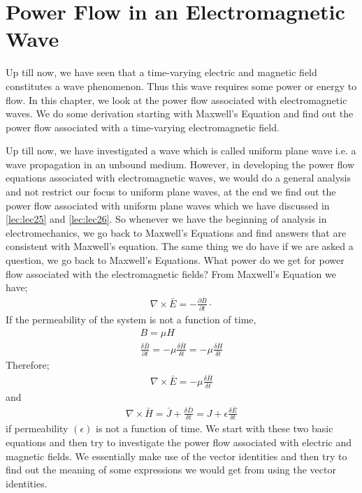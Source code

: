 \chapter{Power Flow in an Electromagnetic Wave}\label{lec:lec27}
Up till now, we have seen that a time-varying electric and magnetic field constitutes a wave phenomenon. Thus this wave requires some power or energy to flow. In this chapter, we look at the power flow associated with electromagnetic waves. We do some derivation starting with Maxwell's Equation and find out the power flow associated with a time-varying electromagnetic field.

Up till now, we have investigated a wave which is called uniform plane wave i.e. a wave propagation in an unbound medium. However, in developing the power flow equations associated with electromagnetic waves, we would do a general analysis and not restrict our focus to uniform plane waves, at the end we find out the power flow associated with uniform plane waves which we have discussed in \autoref{lec:lec25} and \autoref{lec:lec26}. So whenever we have the beginning of analysis in electromechanics, we go back to Maxwell's Equations and find answers that are consistent with Maxwell's equation. The same thing we do have if we are asked a question, we go back to Maxwell's Equations. What power do we get for power flow associated with the electromagnetic fields? From Maxwell's Equation we have;
\begin{align}
\nabla\times\bar{E}=-\frac{\partial\bar{B}}{\partial t} \cdot 
\end{align} 
If the permeability of the system is not a function of time,
\begin{align}
B=\mu H\\
\frac{\delta\bar{B}}{\partial t}= -\mu\frac{\delta\bar{H}}{\delta t} =  - \mu\frac{\delta\bar{H}}{\delta t}
\end{align}
Therefore;
\begin{align}
\nabla\times\bar{E} = -\mu \frac{\delta\bar{H}}{\delta t} 
\end{align} 
and 
\begin{align}
\nabla\times\bar{H} =\bar{J} + \frac{\delta\bar{D}}{\delta t}  =  J + \epsilon\frac{\delta\bar{E}}{\delta t} 
\end{align}
if permeability  $(\epsilon) $ is not a function of time.
We start with these two basic equations and then try to investigate the power flow associated with electric and magnetic fields. We essentially make use of the vector identities and then try to find out the meaning of some expressions we would get from using the vector identities.

